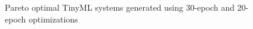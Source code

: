 \begin{figure}[ht]
    \centering
    \caption{Pareto optimal TinyML systems generated using 30-epoch and 20-epoch optimizations}
    \label{fig:pareto_plot_comparison}
\end{figure}
